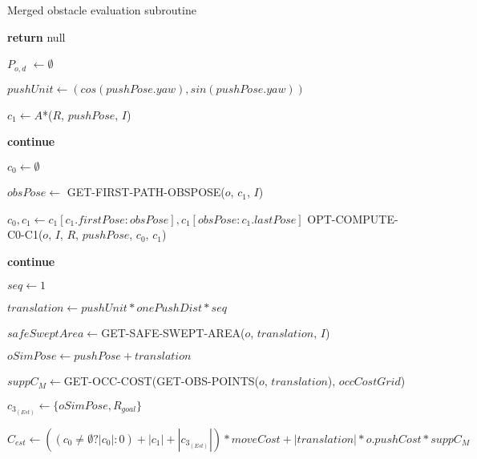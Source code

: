 \begin{algorithm}[H]

  \caption{Merged obstacle evaluation subroutine}

  \label{alg:07-custom-merge-optimized-planforobstacle-part1}

  \begin{algorithmic}[1]


        \State \textbf{return} null
      \EndIf

      \State $P_{o,d}$ $\gets \emptyset$

        \State $pushUnit \gets (cos(pushPose.yaw), sin(pushPose.yaw))$

        \State $c_{1} \gets A$*($R$, $pushPose$, $I$)

          \State \textbf{continue}
        \EndIf

        \State $c_{0} \gets \emptyset$


          \State $obsPose \gets$ GET-FIRST-PATH-OBSPOSE($o$, $c_{1}$, $I$)

            \State $c_{0}, c_{1} \gets c_{1}[c_{1}.firstPose:obsPose], c_{1}[obsPose:c_{1}.lastPose]$
          \Else
            \State OPT-COMPUTE-C0-C1($o$, $I$, $R$, $pushPose$, $c_{0}$, $c_{1}$)

              \State \textbf{continue}
            \EndIf
          \EndIf
        \EndIf

        \State $seq \gets 1$

        \State $translation \gets pushUnit * onePushDist * seq$

        \State $safeSweptArea \gets $GET-SAFE-SWEPT-AREA($o$, $translation$, $I$)

        \State $oSimPose \gets pushPose + translation$

        \State $suppC_{M} \gets $GET-OCC-COST(GET-OBS-POINTS($o$, $translation$), $occCostGrid$)

        \State $c_{3_{(Est)}} \gets \{oSimPose, R_{goal}\}$

        \State $C_{est} \gets ((c_{0} \neq \emptyset ? |c_{0}| : 0) + |c_{1}| + |c_{3_{(Est)}}|) * moveCost + |translation| * o.pushCost * suppC_{M}$


  \end{algorithmic}
\end{algorithm}

